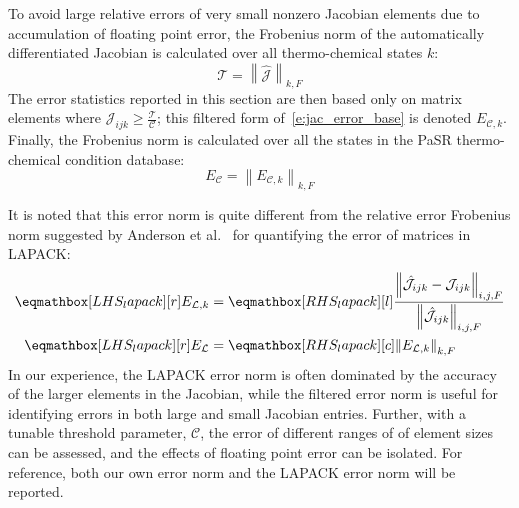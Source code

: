 \documentclass[12pt,number,sort&compress,preprint]{elsarticle}
\begin{document}
To avoid large relative errors of very small nonzero Jacobian elements due to accumulation of floating point error, the Frobenius norm of the automatically differentiated Jacobian is calculated over all thermo-chemical states $k$:
\begin{equation}
 \label{e:thresh}
 \mathcal{T} = \left\lVert \mathcal{\hat{J}} \right\rVert_{k, F}
\end{equation}
The error statistics reported in this section are then based only on matrix elements where $\mathcal{J}_{ijk} \ge \frac{\mathcal{T}}{\mathcal{C}}$; this filtered form of~\cref{e:jac_error_base} is denoted $E_{\mathcal{C},k}$.
Finally, the Frobenius norm is calculated over all the states in the PaSR thermo-chemical condition database:
\begin{equation}
 \label{e:thresholded_error}
 E_{\mathcal{C}} = \left\lVert E_{\mathcal{C},k} \right\rVert_{k, F}
\end{equation}

It is noted that this error norm is quite different from the relative error Frobenius norm suggested by Anderson et al.~\cite{Anderson:1999aa} for quantifying the error of matrices in LAPACK:
\begin{align}
 \label{e:error_lapack}
 \lhs{lapack}{E_{\mathcal{L}, k}} &=  \rhs{lapack}{\frac{\left\lVert \hat{\mathcal{J}}_{ijk} - \mathcal{J}_{ijk} \right\rVert_{i,j,F}}{\left\lVert \hat{\mathcal{J}}_{ijk} \right\rVert_{i,j,F}}} \nonumber \\
 \lhs{lapack}{E_{\mathcal{L}}} &= \rhs{lapack}{\left\lVert  E_{\mathcal{L}, k} \right\rVert_{k, F}}[c]
\end{align}
In our experience, the LAPACK error norm is often dominated by the accuracy of the larger elements in the Jacobian, while the filtered error norm is useful for identifying errors in both large and small Jacobian entries.
Further, with a tunable threshold parameter, $\mathcal{C}$, the error of different ranges of of element sizes can be assessed, and the effects of floating point error can be isolated.
For reference, both our own error norm and the LAPACK error norm will be reported.
\end{document}
